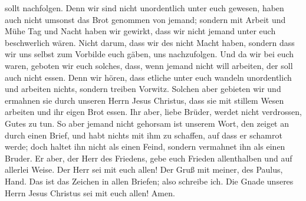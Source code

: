 sollt nachfolgen. Denn wir sind nicht unordentlich unter euch gewesen,
 haben auch nicht umsonst das Brot genommen von jemand;
sondern mit Arbeit und Mühe Tag und Nacht haben wir gewirkt, dass wir
nicht jemand unter euch beschwerlich wären.  Nicht darum,
dass wir des nicht Macht haben, sondern dass wir uns selbst zum Vorbilde
euch gäben, uns nachzufolgen.  Und da wir bei euch waren,
geboten wir euch solches, dass, wenn jemand nicht will arbeiten, der
soll auch nicht essen.  Denn wir hören, dass etliche unter
euch wandeln unordentlich und arbeiten nichts, sondern treiben Vorwitz.
 Solchen aber gebieten wir und ermahnen sie durch unseren
Herrn Jesus Christus, dass sie mit stillem Wesen arbeiten und ihr eigen
Brot essen.  Ihr aber, liebe Brüder, werdet nicht
verdrossen, Gutes zu tun.  So aber jemand nicht gehorsam
ist unserem Wort, den zeiget an durch einen Brief, und habt nichts mit
ihm zu schaffen, auf dass er schamrot werde;  doch haltet
ihn nicht als einen Feind, sondern vermahnet ihn als einen Bruder.
 Er aber, der Herr des Friedens, gebe euch Frieden
allenthalben und auf allerlei Weise. Der Herr sei mit euch allen!
 Der Gruß mit meiner, des Paulus, Hand. Das ist das Zeichen
in allen Briefen; also schreibe ich.  Die Gnade unseres
Herrn Jesus Christus sei mit euch allen! Amen.
